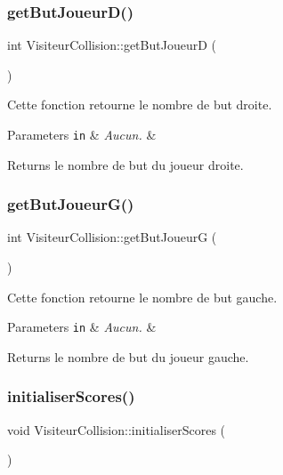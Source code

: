 \subsubsection{\texorpdfstring{get\+But\+Joueur\+D()}{getButJoueurD()}}
{\footnotesize\ttfamily int Visiteur\+Collision\+::get\+But\+JoueurD (\begin{DoxyParamCaption}{ }\end{DoxyParamCaption})}

Cette fonction retourne le nombre de but droite.


\begin{DoxyParams}[1]{Parameters}
\mbox{\tt in}  & {\em Aucun.} & \\
\hline
\end{DoxyParams}
\begin{DoxyReturn}{Returns}
le nombre de but du joueur droite. 
\end{DoxyReturn}
\hypertarget{class_visiteur_collision_aba0f1d8a18ad4cd19521159a73929aed}{}\label{class_visiteur_collision_aba0f1d8a18ad4cd19521159a73929aed} 
\subsubsection{\texorpdfstring{get\+But\+Joueur\+G()}{getButJoueurG()}}
{\footnotesize\ttfamily int Visiteur\+Collision\+::get\+But\+JoueurG (\begin{DoxyParamCaption}{ }\end{DoxyParamCaption})}

Cette fonction retourne le nombre de but gauche.


\begin{DoxyParams}[1]{Parameters}
\mbox{\tt in}  & {\em Aucun.} & \\
\hline
\end{DoxyParams}
\begin{DoxyReturn}{Returns}
le nombre de but du joueur gauche. 
\end{DoxyReturn}
\hypertarget{class_visiteur_collision_a7e38363f989b24004ce4baba0c913957}{}\label{class_visiteur_collision_a7e38363f989b24004ce4baba0c913957} 
\subsubsection{\texorpdfstring{initialiser\+Scores()}{initialiserScores()}}
{\footnotesize\ttfamily void Visiteur\+Collision\+::initialiser\+Scores (\begin{DoxyParamCaption}{ }\end{DoxyParamCaption})}

